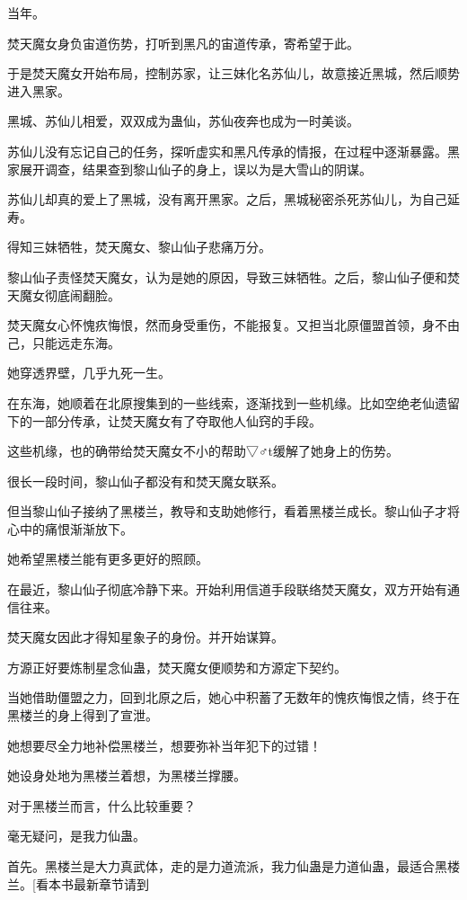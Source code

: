 
\begin{this_body}

当年。

焚天魔女身负宙道伤势，打听到黑凡的宙道传承，寄希望于此。

于是焚天魔女开始布局，控制苏家，让三妹化名苏仙儿，故意接近黑城，然后顺势进入黑家。

黑城、苏仙儿相爱，双双成为蛊仙，苏仙夜奔也成为一时美谈。

苏仙儿没有忘记自己的任务，探听虚实和黑凡传承的情报，在过程中逐渐暴露。黑家展开调查，结果查到黎山仙子的身上，误以为是大雪山的阴谋。

苏仙儿却真的爱上了黑城，没有离开黑家。之后，黑城秘密杀死苏仙儿，为自己延寿。

得知三妹牺牲，焚天魔女、黎山仙子悲痛万分。

黎山仙子责怪焚天魔女，认为是她的原因，导致三妹牺牲。之后，黎山仙子便和焚天魔女彻底闹翻脸。

焚天魔女心怀愧疚悔恨，然而身受重伤，不能报复。又担当北原僵盟首领，身不由己，只能远走东海。

她穿透界壁，几乎九死一生。

在东海，她顺着在北原搜集到的一些线索，逐渐找到一些机缘。比如空绝老仙遗留下的一部分传承，让焚天魔女有了夺取他人仙窍的手段。

这些机缘，也的确带给焚天魔女不小的帮助▽♂t缓解了她身上的伤势。

很长一段时间，黎山仙子都没有和焚天魔女联系。

但当黎山仙子接纳了黑楼兰，教导和支助她修行，看着黑楼兰成长。黎山仙子才将心中的痛恨渐渐放下。

她希望黑楼兰能有更多更好的照顾。

在最近，黎山仙子彻底冷静下来。开始利用信道手段联络焚天魔女，双方开始有通信往来。

焚天魔女因此才得知星象子的身份。并开始谋算。

方源正好要炼制星念仙蛊，焚天魔女便顺势和方源定下契约。

当她借助僵盟之力，回到北原之后，她心中积蓄了无数年的愧疚悔恨之情，终于在黑楼兰的身上得到了宣泄。

她想要尽全力地补偿黑楼兰，想要弥补当年犯下的过错！

她设身处地为黑楼兰着想，为黑楼兰撑腰。

对于黑楼兰而言，什么比较重要？

毫无疑问，是我力仙蛊。

首先。黑楼兰是大力真武体，走的是力道流派，我力仙蛊是力道仙蛊，最适合黑楼兰。[看本书最新章节请到


\end{this_body}
